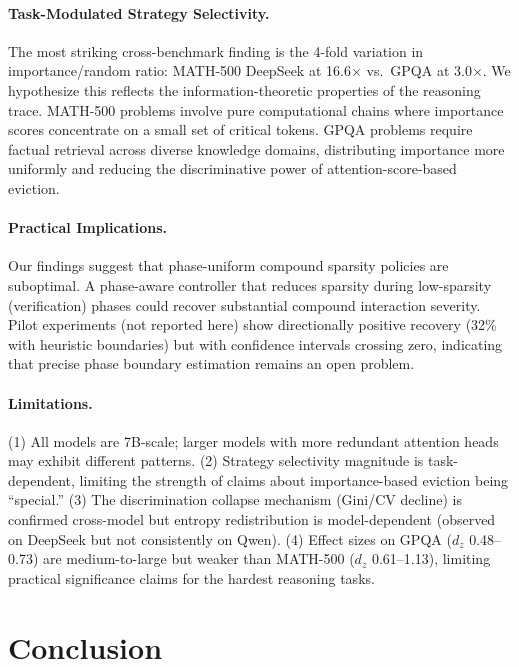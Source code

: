 \documentclass[11pt,a4paper]{article}
\begin{document}
\paragraph{Task-Modulated Strategy Selectivity.}
The most striking cross-benchmark finding is the 4-fold variation in importance/random ratio: MATH-500 DeepSeek at 16.6$\times$ vs.\ GPQA at 3.0$\times$. We hypothesize this reflects the information-theoretic properties of the reasoning trace. MATH-500 problems involve pure computational chains where importance scores concentrate on a small set of critical tokens. GPQA problems require factual retrieval across diverse knowledge domains, distributing importance more uniformly and reducing the discriminative power of attention-score-based eviction.

\paragraph{Practical Implications.}
Our findings suggest that phase-uniform compound sparsity policies are suboptimal. A phase-aware controller that reduces sparsity during low-sparsity (verification) phases could recover substantial compound interaction severity. Pilot experiments (not reported here) show directionally positive recovery (32\% with heuristic boundaries) but with confidence intervals crossing zero, indicating that precise phase boundary estimation remains an open problem.

\paragraph{Limitations.}
(1) All models are 7B-scale; larger models with more redundant attention heads may exhibit different patterns. (2) Strategy selectivity magnitude is task-dependent, limiting the strength of claims about importance-based eviction being ``special.'' (3) The discrimination collapse mechanism (Gini/CV decline) is confirmed cross-model but entropy redistribution is model-dependent (observed on DeepSeek but not consistently on Qwen). (4) Effect sizes on GPQA ($d_z$ 0.48--0.73) are medium-to-large but weaker than MATH-500 ($d_z$ 0.61--1.13), limiting practical significance claims for the hardest reasoning tasks.

\section{Conclusion}
\end{document}
